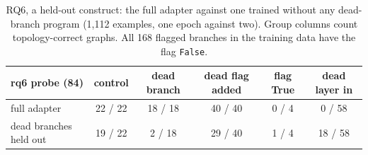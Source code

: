 \begin{table}[!h]
\centering
\small
\begin{tabular}{lccccc}
\hline
rq6 probe (84) & control & dead branch & dead flag added & flag True & dead layer in \\
\hline
full adapter & 22 / 22 & 18 / 18 & 40 / 40 & 0 / 4 & 0 / 58 \\
dead branches held out & 19 / 22 & 2 / 18 & 29 / 40 & 1 / 4 & 18 / 58 \\
\hline
\end{tabular}
\caption{RQ6, a held-out construct: the full adapter against one trained without any dead-branch program (1,112 examples, one epoch against two). Group columns count topology-correct graphs. All 168 flagged branches in the training data have the flag \texttt{False}.}\label{tab:closing_rq6}
\end{table}
